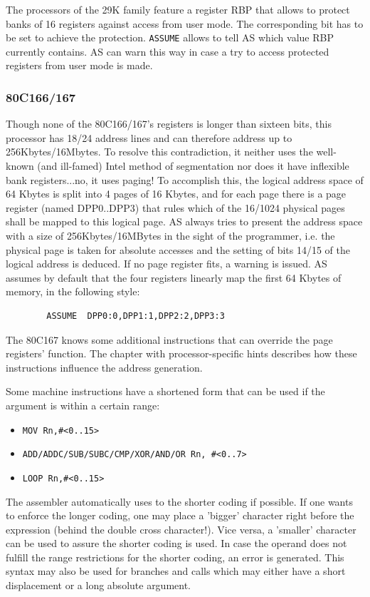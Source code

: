 \documentclass[12pt,twoside]{report}
\newcommand{\tty}[1]{{\tt #1}}
\newcommand{\asname}{{AS}}
\begin{document}
The processors of the 29K family feature a register RBP that allows
to protect banks of 16 registers against access from user mode.  The
corresponding bit has to be set to achieve the protection.  \tty{ASSUME}
allows to tell \asname{} which value RBP currently contains.  \asname{} can warn
this way in case a try to access protected registers from user mode
is made.


\subsubsection{80C166/167}

Though none of the 80C166/167's registers is longer than sixteen bits,
this processor has 18/24 address lines and can therefore address up
to 256Kbytes/16Mbytes.  To resolve this contradiction, it neither
uses the well-known (and ill-famed) Intel method of segmentation nor
does it have inflexible bank registers...no, it uses paging!  To accomplish
this, the logical address space of 64 Kbytes is split into 4 pages of
16 Kbytes, and for each page there is a page register (named
DPP0..DPP3) that rules which of the 16/1024 physical pages shall be
mapped to this logical page.  \asname{} always tries to present the address
space with a size of 256Kbytes/16MBytes in the sight of the
programmer, i.e. the physical page is taken for absolute accesses and
the setting of bits 14/15 of the logical address is deduced.  If no
page register fits, a warning is issued.  \asname{} assumes by default that
the four registers linearly map the first 64 Kbytes of memory, in the
following style:
\begin{verbatim}
        ASSUME  DPP0:0,DPP1:1,DPP2:2,DPP3:3
\end{verbatim}
The 80C167 knows some additional instructions that can override the
page registers' function.  The chapter with processor-specific hints
describes how these instructions influence the address generation.
\par
Some machine instructions have a shortened form that can be used if
the argument is within a certain range:
\begin{itemize}
\item{\verb!MOV Rn,#<0..15>!}
\item{\verb!ADD/ADDC/SUB/SUBC/CMP/XOR/AND/OR Rn, #<0..7>!}
\item{\verb!LOOP Rn,#<0..15>!}
\end{itemize}
The assembler automatically uses to the shorter coding if possible.
If one wants to enforce the longer coding, one may place a 'bigger'
character right before the expression (behind the double cross character!).
Vice versa, a 'smaller' character can be used to assure the shorter
coding is used.  In case the operand does not fulfill the range
restrictions for the shorter coding, an error is generated.  This syntax
may also be used for branches and calls which may either have a short
displacement or a long absolute argument.
\end{document}
